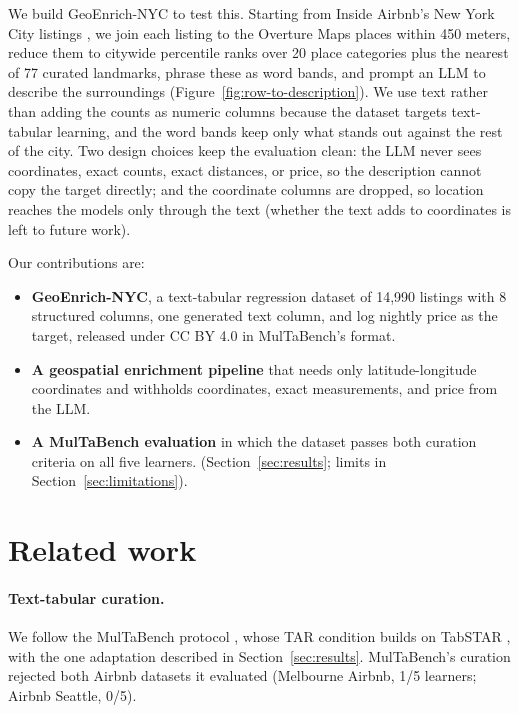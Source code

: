 \documentclass{article}
\begin{document}
We build GeoEnrich-NYC to test this. Starting from Inside Airbnb's New York City listings \citep{insideairbnbnyc},
we join each listing to the Overture Maps places \citep{overtureplaces} within 450 meters,
reduce them to citywide percentile ranks over 20 place categories plus the nearest of 77 curated landmarks,
phrase these as word bands, and prompt an LLM to describe the surroundings (Figure~\ref{fig:row-to-description}).
We use text rather than adding the counts as numeric columns because the dataset targets text-tabular learning,
and the word bands keep only what stands out against the rest of the city.
Two design choices keep the evaluation clean: the LLM never sees coordinates, exact counts, exact distances, or price,
so the description cannot copy the target directly; and the coordinate columns are dropped, so location reaches the models
only through the text (whether the text adds to coordinates is left to future work).

Our contributions are:
\begin{itemize}
  \item \textbf{GeoEnrich-NYC}, a text-tabular regression dataset of 14,990 listings with 8 structured columns,
    one generated text column, and log nightly price as the target, released under CC BY 4.0 in MulTaBench's format.
  \item \textbf{A geospatial enrichment pipeline} that needs only latitude-longitude coordinates and withholds
    coordinates, exact measurements, and price from the LLM.
  \item \textbf{A MulTaBench evaluation} in which the dataset passes both curation criteria on all five learners.
    (Section~\ref{sec:results}; limits in Section~\ref{sec:limitations}).
\end{itemize}


\section{Related work}
\label{sec:related}

\paragraph{Text-tabular curation.} We follow the MulTaBench protocol \citep{arazi2026multabench},
whose TAR condition builds on TabSTAR \citep{arazi2025tabstar}, with the one adaptation described in Section~\ref{sec:results}.
MulTaBench's curation rejected both Airbnb datasets it evaluated (Melbourne Airbnb, 1/5 learners; Airbnb Seattle, 0/5).
\end{document}
